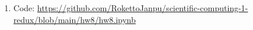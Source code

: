 \documentclass{article}
\begin{document}
\begin{enumerate}
\begin{enumerate}
		\item
		
		
		
		\item
		
		
		
		\item
		
		
		
		\item
		
		
		
		\item
		
		
		
	\end{enumerate}



	\pagebreak
	
	
	
	\item Code: \url{https://github.com/RokettoJanpu/scientific-computing-1-redux/blob/main/hw8/hw8.ipynb}
	

\end{enumerate}
\end{document}
